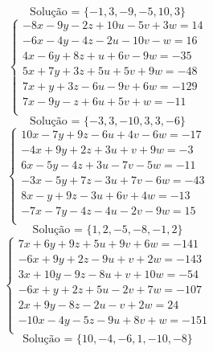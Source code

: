 \documentclass[12pt,oneside,a4paper]{article}
\begin{document}
\begin{equation*}
\text{Solução = }\{-1,3,-9,-5,10,3\}
\end{equation*}
\vspace{\baselineskip}
\begin{equation*}
\begin{cases}
-8x-9y-2z+10u-5v+3w=14 \\
-6x-4y-4z-2u-10v-w=16 \\
4x-6y+8z+u+6v-9w=-35 \\
5x+7y+3z+5u+5v+9w=-48 \\
7x+y+3z-6u-9v+6w=-129 \\
7x-9y-z+6u+5v+w=-11 \\
\end{cases}
\end{equation*}
\begin{equation*}
\text{Solução = }\{-3,3,-10,3,3,-6\}
\end{equation*}
\vspace{\baselineskip}
\begin{equation*}
\begin{cases}
10x-7y+9z-6u+4v-6w=-17 \\
-4x+9y+2z+3u+v+9w=-3 \\
6x-5y-4z+3u-7v-5w=-11 \\
-3x-5y+7z-3u+7v-6w=-43 \\
8x-y+9z-3u+6v+4w=-13 \\
-7x-7y-4z-4u-2v-9w=15 \\
\end{cases}
\end{equation*}
\begin{equation*}
\text{Solução = }\{1,2,-5,-8,-1,2\}
\end{equation*}
\vspace{\baselineskip}
\begin{equation*}
\begin{cases}
7x+6y+9z+5u+9v+6w=-141 \\
-6x+9y+2z-9u+v+2w=-143 \\
3x+10y-9z-8u+v+10w=-54 \\
-6x+y+2z+5u-2v+7w=-107 \\
2x+9y-8z-2u-v+2w=24 \\
-10x-4y-5z-9u+8v+w=-151 \\
\end{cases}
\end{equation*}
\begin{equation*}
\text{Solução = }\{10,-4,-6,1,-10,-8\}
\end{equation*}
\end{document}
